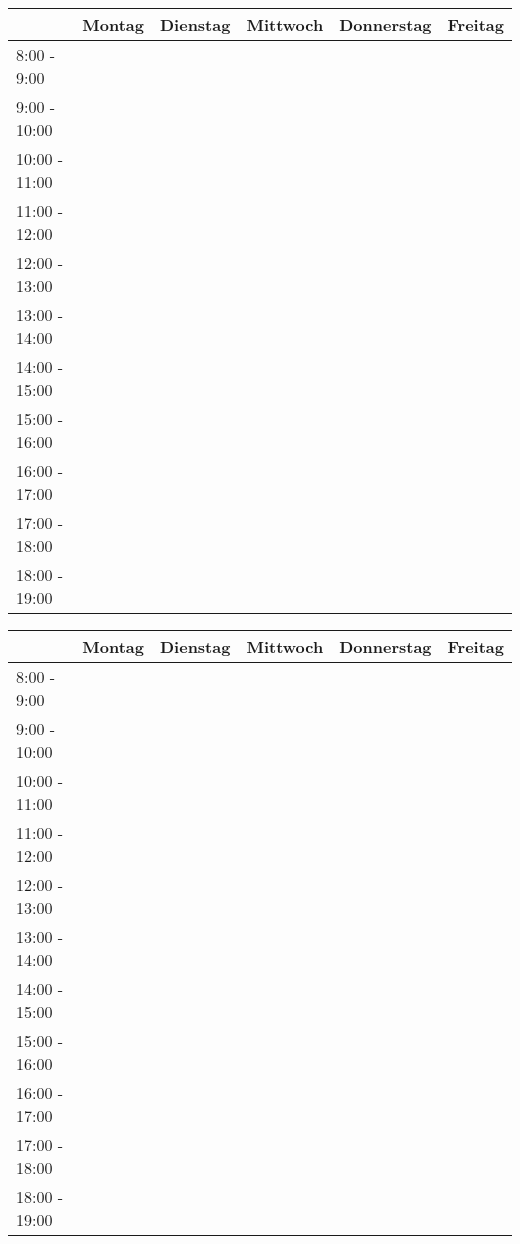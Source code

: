 \documentclass[a4paper]{article}
\theoremstyle{definition} %
\begin{document}
\begin{landscape}
  \begin{center}
    \begin{tabular}{|p{2.5cm}|p{3.5cm}|p{3.5cm}|p{3.5cm}|p{3.5cm}|p{3.5cm}|} 
      \hline
      & Montag & Dienstag & Mittwoch & Donnerstag & Freitag \\ 
      \hline
      8:00 - 9:00 & & & & & \\ 
      \hline
      9:00 - 10:00 & & & & & \\ 
      \hline
      10:00 - 11:00 & & & & & \\ 
      \hline
      11:00 - 12:00 & & & & & \\ 
      \hline
      12:00 - 13:00 & & & & & \\ 
      \hline
      13:00 - 14:00 & & & & & \\ 
      \hline
      14:00 - 15:00 & & & & & \\ 
      \hline
      15:00 - 16:00 & & & & & \\ 
      \hline
      16:00 - 17:00 & & & & & \\ 
      \hline
      17:00 - 18:00 & & & & & \\ 
      \hline
      18:00 - 19:00 & & & & & \\
      \hline
    \end{tabular}
  \end{center}
  \begin{center}
    \begin{tabular}{|p{2.5cm}|p{3.5cm}|p{3.5cm}|p{3.5cm}|p{3.5cm}|p{3.5cm}|} 
      \hline
      & Montag & Dienstag & Mittwoch & Donnerstag & Freitag \\ 
      \hline
      8:00 - 9:00 & & & & & \\ 
      \hline
      9:00 - 10:00 & & & & & \\ 
      \hline
      10:00 - 11:00 & & & & & \\ 
      \hline
      11:00 - 12:00 & & & & & \\ 
      \hline
      12:00 - 13:00 & & & & & \\ 
      \hline
      13:00 - 14:00 & & & & & \\ 
      \hline
      14:00 - 15:00 & & & & & \\ 
      \hline
      15:00 - 16:00 & & & & & \\ 
      \hline
      16:00 - 17:00 & & & & & \\ 
      \hline
      17:00 - 18:00 & & & & & \\ 
      \hline
      18:00 - 19:00 & & & & & \\
      \hline
    \end{tabular}
  \end{center}
\end{landscape}
\end{document}
